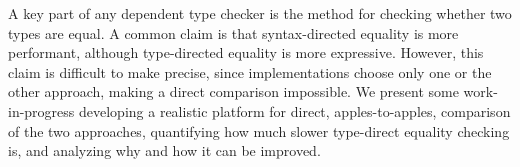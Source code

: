 A key part of any dependent type checker is the method for checking whether two types are equal.
A common claim is that syntax-directed equality is more performant, although type-directed equality is more expressive.
However, this claim is difficult to make precise, since implementations choose only one or the other approach, making a direct comparison impossible.
We present some work-in-progress developing a realistic platform for direct, apples-to-apples, comparison of the two approaches, quantifying how much slower type-direct equality checking is, and analyzing why and how it can be improved.
